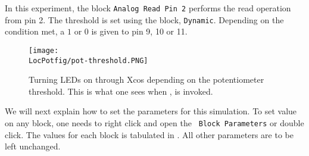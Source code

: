 In this experiment, the block {\tt Analog Read Pin 2} performs the read 
operation from pin 2. The threshold is set using the block, {\tt Dynamic}. 
Depending on the condition met, a $1$ or $0$ is given to pin 9, 10 or 11.

\begin{figure}
  \centering
  \texttt{[image: \\LocPotfig/pot-threshold.PNG]}
  \caption[Turning LEDs on through Xcos depending on the potentiometer
  threshold]{Turning LEDs on through Xcos depending on the
    potentiometer threshold.  This is what one sees when
      , is invoked.}
  \label{fig:pot-threshold}
\end{figure}

We will next explain how to set the parameters for this simulation.
To set value on any block, one needs to right click and open the {\tt
  Block Parameters} or double click.  The values for each block is
tabulated in .  All other parameters are to
be left unchanged.
